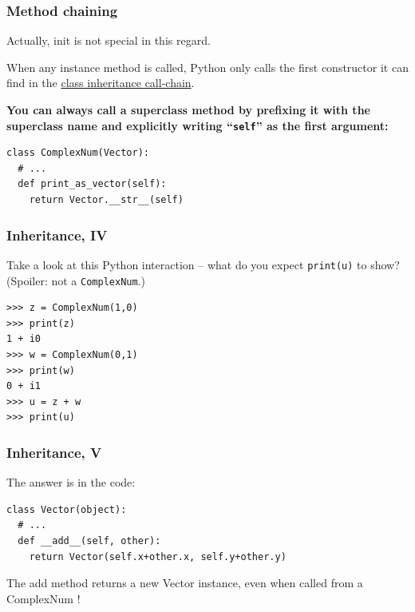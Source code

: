 \begin{frame}[fragile]\frametitle{Method chaining}

  Actually, init is not special in this regard.

  When any instance method is called, Python only calls the first
  constructor it can find in the
  \href{http://www.python.org/download/releases/2.3/mro/}{class
    inheritance call-chain}.

  \textbf{You can always call a superclass method by prefixing it
    with the superclass name and explicitly writing ``\texttt{self}''
    as the first argument:}
    \begin{lstlisting}
class ComplexNum(Vector):
  # ...
  def print_as_vector(self):
    return Vector.__str__(self)
    \end{lstlisting}
\end{frame}

\begin{frame}[fragile]\frametitle{Inheritance, IV}
Take a look at this Python interaction -- what do you expect \lstinline|print(u)| to show?
(Spoiler: not a \texttt{ComplexNum}.)
\begin{lstlisting}
>>> z = ComplexNum(1,0)
>>> print(z)
1 + i0
>>> w = ComplexNum(0,1)
>>> print(w)
0 + i1
>>> u = z + w
>>> print(u)
\end{lstlisting}


\end{frame}

\begin{frame}[fragile]\frametitle{Inheritance, V}
  The answer is in the code:
    \begin{lstlisting}
class Vector(object):
  # ...
  def __add__(self, other):
    return Vector(self.x+other.x, self.y+other.y)
    \end{lstlisting}
    
    The add method returns a new
    Vector instance, even when called from a
    ComplexNum !
\end{frame}

